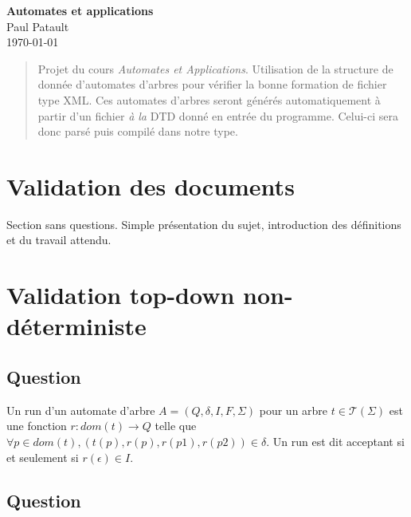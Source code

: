 \documentclass[twoside,12pt]{article}
\begin{document}

\thispagestyle{empty}

\vspace*{1.3cm}
\begin{center}
    \textbf{\LARGE Automates et applications} \\
    \bigskip\bigskip
    {\large Paul Patault} \\ %
    \bigskip
    \today
    \bigskip
\end{center}

\begin{abstract}
    Projet du cours \textit{Automates et Applications}. Utilisation de la structure
    de donnée d'automates d'arbres pour vérifier la bonne formation de fichier type
    XML. Ces automates d'arbres seront générés automatiquement à partir d'un fichier
    \textit{à la} DTD donné en entrée du programme. Celui-ci sera donc parsé puis
    compilé dans notre type.
\end{abstract}


\section{Validation des documents}
Section sans questions.
Simple présentation du sujet, introduction des définitions et du travail attendu.


\section{Validation top-down non-déterministe}
\subsection{Question}

Un run d'un automate d'arbre $A = (Q, \delta, I, F, \Sigma)$
pour un arbre $t \in {\mathcal{T}}(\Sigma)$
est une fonction $r : dom(t) \to Q$
telle que $\forall p \in dom(t), (t(p), r(p), r(p1),r(p2)) \in \delta$.
Un run est dit acceptant si et seulement si $r (\epsilon) \in I$.

\subsection{Question}
\end{document}

